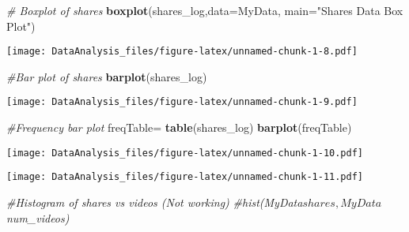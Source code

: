 \documentclass[]{article}
\newenvironment{Shaded}{\begin{snugshade}}{\end{snugshade}}
\newcommand{\KeywordTok}[1]{\textcolor[rgb]{0.13,0.29,0.53}{\textbf{#1}}}
\newcommand{\DataTypeTok}[1]{\textcolor[rgb]{0.13,0.29,0.53}{#1}}
\newcommand{\StringTok}[1]{\textcolor[rgb]{0.31,0.60,0.02}{#1}}
\newcommand{\CommentTok}[1]{\textcolor[rgb]{0.56,0.35,0.01}{\textit{#1}}}
\newcommand{\OperatorTok}[1]{\textcolor[rgb]{0.81,0.36,0.00}{\textbf{#1}}}
\newcommand{\NormalTok}[1]{#1}
\begin{document}
\begin{Shaded}
\begin{Highlighting}[]
\CommentTok{# Boxplot of shares}
\KeywordTok{boxplot}\NormalTok{(shares_log,}\DataTypeTok{data=}\NormalTok{MyData, }\DataTypeTok{main=}\StringTok{"Shares Data Box Plot"}\NormalTok{)}
\end{Highlighting}
\end{Shaded}

\texttt{[image: DataAnalysis\_files/figure-latex/unnamed-chunk-1-8.pdf]}

\begin{Shaded}
\begin{Highlighting}[]
\CommentTok{#Bar plot of shares}
\KeywordTok{barplot}\NormalTok{(shares_log)}
\end{Highlighting}
\end{Shaded}

\texttt{[image: DataAnalysis\_files/figure-latex/unnamed-chunk-1-9.pdf]}

\begin{Shaded}
\begin{Highlighting}[]
\CommentTok{#Frequency bar plot}
\NormalTok{freqTable=}\StringTok{ }\KeywordTok{table}\NormalTok{(shares_log)}
\KeywordTok{barplot}\NormalTok{(freqTable)}
\end{Highlighting}
\end{Shaded}

\texttt{[image: DataAnalysis\_files/figure-latex/unnamed-chunk-1-10.pdf]}

\begin{Shaded}
\end{Shaded}

\texttt{[image: DataAnalysis\_files/figure-latex/unnamed-chunk-1-11.pdf]}

\begin{Shaded}
\begin{Highlighting}[]
\CommentTok{#Histogram of shares vs videos (Not working)}
\CommentTok{#hist(MyData$shares,MyData$num_videos)}
\end{Highlighting}
\end{Shaded}
\end{document}
